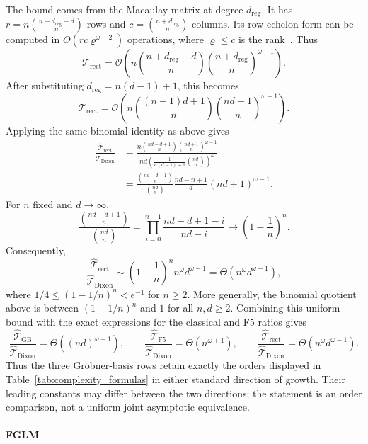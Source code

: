 The bound comes from the Macaulay matrix at degree $d_{\mathrm{reg}}$. It has $r=n\binom{n+d_{\mathrm{reg}}-d}{n}$ rows and $c=\binom{n+d_{\mathrm{reg}}}{n}$ columns. Its row echelon form can be computed in $O(rc\varrho^{\omega-2})$ operations, where $\varrho\le c$ is the rank~\cite{storjohann2000algorithms}. Thus
\[
\mathcal T_{\mathrm{rect}}
=\mathcal O\!\left(n\binom{n+d_{\mathrm{reg}}-d}{n}
\binom{n+d_{\mathrm{reg}}}{n}^{\omega-1}\right).
\]
After substituting $d_{\mathrm{reg}}=n(d-1)+1$, this becomes
\[
\mathcal T_{\mathrm{rect}}
=\mathcal O\!\left(n\binom{(n-1)d+1}{n}\binom{nd+1}{n}^{\omega-1}\right).
\]
Applying the same binomial identity as above gives
\begin{align*}
\frac{\widehat{\mathcal T}_{\mathrm{rect}}}{\widehat{\mathcal T}_{\mathrm{Dixon}}}
&=\frac{n\binom{nd-d+1}{n}\binom{nd+1}{n}^{\omega-1}}{nd\left(\frac{1}{n(d-1)+1}\binom{nd}{n}\right)^\omega}\\
&=\frac{\binom{nd-d+1}{n}}{\binom{nd}{n}}
\frac{nd-n+1}{d}(nd+1)^{\omega-1}.
\end{align*}
For $n$ fixed and $d\to\infty$,
\[
\frac{\binom{nd-d+1}{n}}{\binom{nd}{n}}
=\prod_{i=0}^{n-1}\frac{nd-d+1-i}{nd-i}
\longrightarrow\left(1-\frac1n\right)^n.
\]
Consequently,
\[
\frac{\widehat{\mathcal T}_{\mathrm{rect}}}{\widehat{\mathcal T}_{\mathrm{Dixon}}}
\sim\left(1-\frac1n\right)^n n^\omega d^{\omega-1}
=\Theta\!\left(n^\omega d^{\omega-1}\right),
\]
where $1/4\le(1-1/n)^n<e^{-1}$ for $n\ge2$. More generally, the binomial quotient above is between $(1-1/n)^n$ and $1$ for all $n,d\ge2$. Combining this uniform bound with the exact expressions for the classical and F5 ratios gives
\[
\frac{\widehat{\mathcal T}_{\mathrm{GB}}}{\widehat{\mathcal T}_{\mathrm{Dixon}}}
=\Theta\!\left((nd)^{\omega-1}\right),\qquad
\frac{\widehat{\mathcal T}_{\mathrm{F5}}}{\widehat{\mathcal T}_{\mathrm{Dixon}}}
=\Theta\!\left(n^{\omega+1}\right),\qquad
\frac{\widehat{\mathcal T}_{\mathrm{rect}}}{\widehat{\mathcal T}_{\mathrm{Dixon}}}
=\Theta\!\left(n^\omega d^{\omega-1}\right).
\]
Thus the three Gr\"obner-basis rows retain exactly the orders displayed in Table~\ref{tab:complexity_formulas} in either standard direction of growth. Their leading constants may differ between the two directions; the statement is an order comparison, not a uniform joint asymptotic equivalence.

\paragraph{FGLM~\cite{DBLP:journals/jsc/FaugereGLM93,DBLP:journals/tosc/KoschatkoLR24}}


